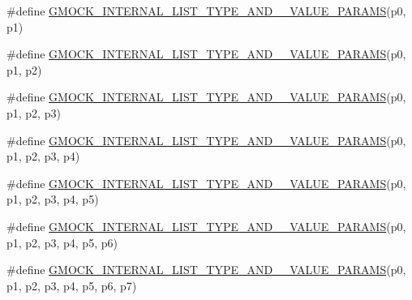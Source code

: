 \begin{DoxyCompactItemize}
\item 
\#define \mbox{\hyperlink{_obj__test_2lib_2googletest-release-1_88_81_2googlemock_2include_2gmock_2gmock-generated-actions_8h_a0cc50d9b0c031e712a38a3266b03af48}{G\+M\+O\+C\+K\+\_\+\+I\+N\+T\+E\+R\+N\+A\+L\+\_\+\+L\+I\+S\+T\+\_\+\+T\+Y\+P\+E\+\_\+\+A\+N\+D\+\_\+\_\+\+V\+A\+L\+U\+E\+\_\+\+P\+A\+R\+A\+MS}}(p0,  p1)
\item 
\#define \mbox{\hyperlink{_obj__test_2lib_2googletest-release-1_88_81_2googlemock_2include_2gmock_2gmock-generated-actions_8h_a5654c0d7f59fc85880c24738b6cb5976}{G\+M\+O\+C\+K\+\_\+\+I\+N\+T\+E\+R\+N\+A\+L\+\_\+\+L\+I\+S\+T\+\_\+\+T\+Y\+P\+E\+\_\+\+A\+N\+D\+\_\+\_\+\+V\+A\+L\+U\+E\+\_\+\+P\+A\+R\+A\+MS}}(p0,  p1,  p2)
\item 
\#define \mbox{\hyperlink{_obj__test_2lib_2googletest-release-1_88_81_2googlemock_2include_2gmock_2gmock-generated-actions_8h_ad00ece06c41ce47e499fef47d0ee9459}{G\+M\+O\+C\+K\+\_\+\+I\+N\+T\+E\+R\+N\+A\+L\+\_\+\+L\+I\+S\+T\+\_\+\+T\+Y\+P\+E\+\_\+\+A\+N\+D\+\_\+\_\+\+V\+A\+L\+U\+E\+\_\+\+P\+A\+R\+A\+MS}}(p0,  p1,  p2,  p3)
\item 
\#define \mbox{\hyperlink{_obj__test_2lib_2googletest-release-1_88_81_2googlemock_2include_2gmock_2gmock-generated-actions_8h_a48e2764f7132a1840c2a4afe8d43556b}{G\+M\+O\+C\+K\+\_\+\+I\+N\+T\+E\+R\+N\+A\+L\+\_\+\+L\+I\+S\+T\+\_\+\+T\+Y\+P\+E\+\_\+\+A\+N\+D\+\_\+\_\+\+V\+A\+L\+U\+E\+\_\+\+P\+A\+R\+A\+MS}}(p0,  p1,  p2,  p3,  p4)
\item 
\#define \mbox{\hyperlink{_obj__test_2lib_2googletest-release-1_88_81_2googlemock_2include_2gmock_2gmock-generated-actions_8h_ab2f48b9bf3f455e081eac982aee31740}{G\+M\+O\+C\+K\+\_\+\+I\+N\+T\+E\+R\+N\+A\+L\+\_\+\+L\+I\+S\+T\+\_\+\+T\+Y\+P\+E\+\_\+\+A\+N\+D\+\_\+\_\+\+V\+A\+L\+U\+E\+\_\+\+P\+A\+R\+A\+MS}}(p0,  p1,  p2,  p3,  p4,  p5)
\item 
\#define \mbox{\hyperlink{_obj__test_2lib_2googletest-release-1_88_81_2googlemock_2include_2gmock_2gmock-generated-actions_8h_aa090e804a45b4373d38e6a0aa35e5997}{G\+M\+O\+C\+K\+\_\+\+I\+N\+T\+E\+R\+N\+A\+L\+\_\+\+L\+I\+S\+T\+\_\+\+T\+Y\+P\+E\+\_\+\+A\+N\+D\+\_\+\_\+\+V\+A\+L\+U\+E\+\_\+\+P\+A\+R\+A\+MS}}(p0,  p1,  p2,  p3,  p4,  p5,  p6)
\item 
\#define \mbox{\hyperlink{_obj__test_2lib_2googletest-release-1_88_81_2googlemock_2include_2gmock_2gmock-generated-actions_8h_ac46093455522025b3461ed0dfd326836}{G\+M\+O\+C\+K\+\_\+\+I\+N\+T\+E\+R\+N\+A\+L\+\_\+\+L\+I\+S\+T\+\_\+\+T\+Y\+P\+E\+\_\+\+A\+N\+D\+\_\+\_\+\+V\+A\+L\+U\+E\+\_\+\+P\+A\+R\+A\+MS}}(p0,  p1,  p2,  p3,  p4,  p5,  p6,  p7)

\end{DoxyCompactItemize}
